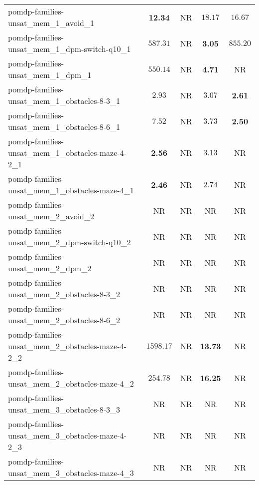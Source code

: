 \begin{tabular}{lcccc}
pomdp-families-unsat\_mem\_1\_avoid\_1 & \textbf{12.34} & NR & $18.17$ & $16.67$ \\
pomdp-families-unsat\_mem\_1\_dpm-switch-q10\_1 & $587.31$ & NR & \textbf{3.05} & $855.20$ \\
pomdp-families-unsat\_mem\_1\_dpm\_1 & $550.14$ & NR & \textbf{4.71} & NR \\
pomdp-families-unsat\_mem\_1\_obstacles-8-3\_1 & $2.93$ & NR & $3.07$ & \textbf{2.61} \\
pomdp-families-unsat\_mem\_1\_obstacles-8-6\_1 & $7.52$ & NR & $3.73$ & \textbf{2.50} \\
pomdp-families-unsat\_mem\_1\_obstacles-maze-4-2\_1 & \textbf{2.56} & NR & $3.13$ & NR \\
pomdp-families-unsat\_mem\_1\_obstacles-maze-4\_1 & \textbf{2.46} & NR & $2.74$ & NR \\
pomdp-families-unsat\_mem\_2\_avoid\_2 & NR & NR & NR & NR \\
pomdp-families-unsat\_mem\_2\_dpm-switch-q10\_2 & NR & NR & NR & NR \\
pomdp-families-unsat\_mem\_2\_dpm\_2 & NR & NR & NR & NR \\
pomdp-families-unsat\_mem\_2\_obstacles-8-3\_2 & NR & NR & NR & NR \\
pomdp-families-unsat\_mem\_2\_obstacles-8-6\_2 & NR & NR & NR & NR \\
pomdp-families-unsat\_mem\_2\_obstacles-maze-4-2\_2 & $1598.17$ & NR & \textbf{13.73} & NR \\
pomdp-families-unsat\_mem\_2\_obstacles-maze-4\_2 & $254.78$ & NR & \textbf{16.25} & NR \\
pomdp-families-unsat\_mem\_3\_obstacles-8-3\_3 & NR & NR & NR & NR \\
pomdp-families-unsat\_mem\_3\_obstacles-maze-4-2\_3 & NR & NR & NR & NR \\
pomdp-families-unsat\_mem\_3\_obstacles-maze-4\_3 & NR & NR & NR & NR \\
\bottomrule
\end{tabular}
